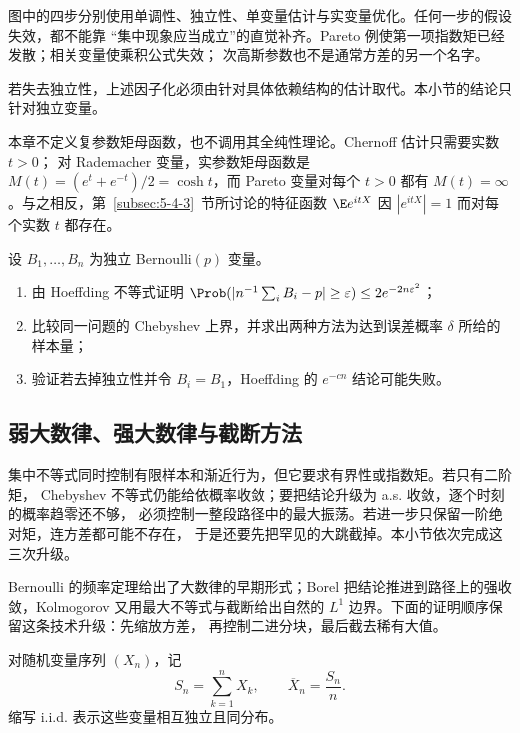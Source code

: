 图中的四步分别使用单调性、独立性、单变量估计与实变量优化。任何一步的假设失效，都不能靠
“集中现象应当成立”的直觉补齐。Pareto 例使第一项指数矩已经发散；相关变量使乘积公式失效；
次高斯参数也不是通常方差的另一个名字。

若失去独立性，上述因子化必须由针对具体依赖结构的估计取代。本小节的结论只针对独立变量。

\begin{remark}[本章只使用实参数矩母函数]\label{rem:5-4-1-complex-mgf}
本章不定义复参数矩母函数，也不调用其全纯性理论。Chernoff 估计只需要实数 $t>0$；
对 Rademacher 变量，实参数矩母函数是
$M(t)=(e^t+e^{-t})/2=\cosh t$，而 Pareto 变量对每个 $t>0$ 都有
$M(t)=\infty$。与之相反，第~\ref{subsec:5-4-3}~节所讨论的特征函数
$\E e^{itX}$ 因 $|e^{itX}|=1$ 而对每个实数 $t$ 都存在。
\end{remark}

\begin{exercise}
设 $B_1,\dots,B_n$ 为独立 Bernoulli$(p)$ 变量。
\begin{enumerate}
 \item 由 Hoeffding 不等式证明
 $\Prob(|n^{-1}\sum_iB_i-p|\geq\varepsilon)\leq2e^{-2n\varepsilon^2}$；
 \item 比较同一问题的 Chebyshev 上界，并求出两种方法为达到误差概率 $\delta$ 所给的样本量；
 \item 验证若去掉独立性并令 $B_i=B_1$，Hoeffding 的 $e^{-cn}$ 结论可能失败。
\end{enumerate}
\end{exercise}

\subsection{弱大数律、强大数律与截断方法}\label{subsec:5-4-2}

集中不等式同时控制有限样本和渐近行为，但它要求有界性或指数矩。若只有二阶矩，
Chebyshev 不等式仍能给依概率收敛；要把结论升级为 a.s. 收敛，逐个时刻的概率趋零还不够，
必须控制一整段路径中的最大振荡。若进一步只保留一阶绝对矩，连方差都可能不存在，
于是还要先把罕见的大跳截掉。本小节依次完成这三次升级。

Bernoulli 的频率定理给出了大数律的早期形式；Borel 把结论推进到路径上的强收敛，Kolmogorov
又用最大不等式与截断给出自然的 $L^1$ 边界。下面的证明顺序保留这条技术升级：先缩放方差，
再控制二进分块，最后截去稀有大值。

\begin{definition}[样本和与样本平均]\label{def:5-4-2-1}
对随机变量序列 $(X_n)$，记
\[
 S_n=\sum_{k=1}^nX_k,
 \qquad
 \overline X_n=\frac{S_n}{n}.
\]
缩写 i.i.d. 表示这些变量相互独立且同分布。
\end{definition}

